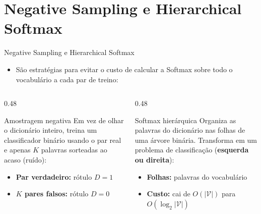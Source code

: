 
\section{Negative Sampling e Hierarchical Softmax}

\begin{frame}{Negative Sampling e Hierarchical Softmax}
\begin{itemize}
    \item São estratégias para evitar o custo de calcular a Softmax sobre todo o vocabulário a cada par de treino:
\end{itemize}

\vspace{0.3cm}

\begin{columns}[T]
    \begin{column}{0.48\textwidth}
        \begin{block}{Amostragem negativa}
            Em vez de olhar o dicionário inteiro, treina um classificador binário usando o par real e apenas $K$ palavras sorteadas ao acaso (ruído):
            \vspace{4pt}
            \begin{itemize}
                \item \textbf{Par verdadeiro:} rótulo $D = 1$
                \item \textbf{$K$ pares falsos:} rótulo $D = 0$
            \end{itemize}
        \end{block}
    \end{column}

    \begin{column}{0.48\textwidth}
        \begin{block}{Softmax hierárquica}
            Organiza as palavras do dicionário nas folhas de uma árvore binária. Transforma em um problema de classificação (\textbf{esquerda ou direita}):
            \vspace{4pt}
            \begin{itemize}
                \item \textbf{Folhas:} palavras do vocabulário
                \item \textbf{Custo:} cai de $O(|\mathcal{V}|)$ para $O(\log_2 |\mathcal{V}|)$
            \end{itemize}
        \end{block}
    \end{column}
\end{columns}


\end{frame}
